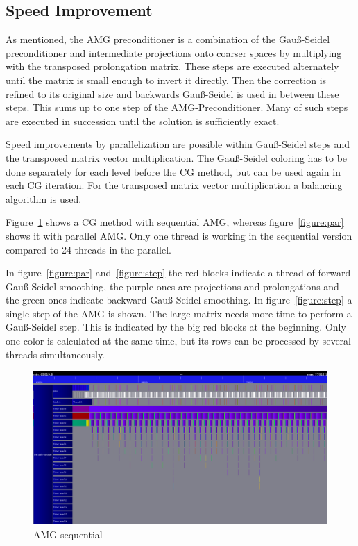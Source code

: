 \documentclass[a4paper,11pt]{scrartcl}
\begin{document}
\subsection{Speed Improvement}
As mentioned, the AMG preconditioner is a combination of the Gauß-Seidel
preconditioner and intermediate projections onto coarser spaces
by multiplying with the transposed prolongation matrix. These steps are
executed alternately until the matrix is small enough to invert it directly.
Then the correction is refined to its original size and backwards Gauß-Seidel is
used in between these steps.
This sums up to one step of the AMG-Preconditioner. Many of such steps are
executed in succession until the solution is sufficiently exact.

Speed improvements by parallelization are possible within Gauß-Seidel steps
and the transposed matrix vector multiplication. The Gauß-Seidel coloring has to
be done separately for each level before the CG method, but can be used again
in each CG iteration. For the transposed matrix vector multiplication a
balancing algorithm is used.

Figure~\ref{figure:sequ} shows a CG method with sequential AMG, whereas
figure~\ref{figure:par} shows it with parallel AMG\@.
Only one thread is working in the sequential version compared to 24 threads in
the parallel.

In figure~\ref{figure:par} and~\ref{figure:step} the red blocks indicate a
thread of forward Gauß-Seidel smoothing, the purple ones are projections and
prolongations and the green ones indicate backward Gauß-Seidel smoothing.
In figure~\ref{figure:step} a single step of the AMG is shown. The large matrix
needs more time to perform a Gauß-Seidel step.
This is indicated by the big red blocks at the beginning. Only one color is
calculated at the same time, but its rows can be processed by several threads
simultaneously.

\begin{figure}
    \includegraphics[width=1\textwidth]{seq.png}
    \caption{AMG sequential}\label{figure:sequ}
\end{figure}
\end{document}
